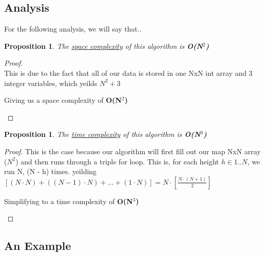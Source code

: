 \documentclass[12pt]{article}
\newtheorem{proposition}[theorem]{Proposition}
\begin{document}
\subsection{Analysis}
For the following analysis, we will say that..

\begin{proposition}
\label{numq}
The \underline{space complexity} of this algorithm is \textbf{O(N$^2$)}
\end{proposition}

\begin{proof}
~ \\ \indent This is due to the fact that all of our data is stored in one NxN int array and 3
integer variables, which yeilds $N^2+3$
\begin{center}
    Giving us a space complexity of \textbf{O(N$^2$)}
\end{center}
\end{proof}

\begin{proposition}
\label{numq}
The \underline{time complexity} of this algorithm is \textbf{O(N$^3$)}
\end{proposition}

\begin{proof}
This is the case because our algorithm will first fill out our map NxN array
($N^2$) and then runs through a triple for loop. This is, for each height $h \in 1..N$, we
run N,  (N - h) times. yeilding $[(N \cdot N) + ((N-1) \cdot N) + \dots + (1 \cdot N)] = N \cdot [\frac{N \cdot (N+1)}{2}]$

\begin{center}
    Simplifying to a time complexity of \textbf{O(N$^3$)}
\end{center}
\end{proof}


\subsection{An Example}
\end{document}
